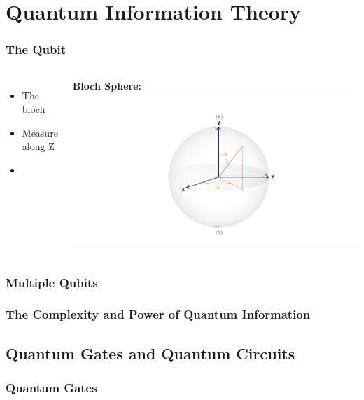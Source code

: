 \documentclass[aspectratio=169,11pt,hyperref={colorlinks=true}]{beamer}
\begin{document}
\section{Quantum Information Theory}
\begin{frame}
    \frametitle{The Qubit}
    \begin{columns}
            \begin{itemize}
                \item The bloch 
                \item Measure along Z
                \item 
            \end{itemize}
            \centering
            \textbf{Bloch Sphere:}
            \includegraphics[width=\textwidth]{bloch_angles.png}
    \end{columns}
\end{frame}

\begin{frame}
    \frametitle{Multiple Qubits}
    
\end{frame}

\begin{frame}
    \frametitle{The Complexity and Power of Quantum Information}
\end{frame}

\subsection{Quantum Gates and Quantum Circuits}
\begin{frame}
    \frametitle{Quantum Gates}
\end{frame}
\end{document}
